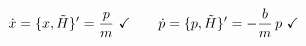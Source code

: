 \documentclass[preview]{standalone}
\begin{document}
\begin{align*}
\special{dvisvgm:raw <g id='unique000'>}\dot x=\{x,\tilde H\}'=\frac pm\ \checkmark\qquad \dot p=\{p,\tilde H\}'=-\frac bm\,p\ \checkmark\special{dvisvgm:raw </g>}
\end{align*}
\end{document}
